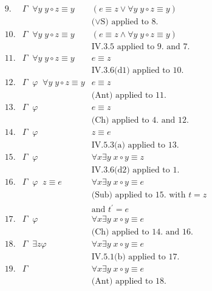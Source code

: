 \begin{enumerate}[1.]
\begin{enumerate}[(i)]
\begin{enumerate}
\[\begin{array}{lll}
9. & \Gamma \;\; \forall y \; y \circ z \equiv y & (e \equiv z \lor \forall y \; y \circ z \equiv y) \\
\  & \                   & \mbox{($\lor$S) applied to 8.} \\
10.& \Gamma \;\; \forall y \; y \circ z \equiv y & (e \equiv z \land \forall y \; y \circ z \equiv y) \\
\  & \                   & \mbox{IV.3.5 applied to 9. and 7.} \\
11.& \Gamma \;\; \forall y \; y \circ z \equiv y & e \equiv z \\
\  & \                   & \mbox{IV.3.6(d1) applied to 10.} \\
12.& \Gamma \;\; \varphi \;\; \forall y \; y \circ z \equiv y & e \equiv z \\
\  & \                   & \mbox{(Ant) applied to 11.} \\
13.& \Gamma \;\; \varphi & e \equiv z \\
\  & \                   & \mbox{(Ch) applied to 4. and 12.} \\
14.& \Gamma \;\; \varphi & z \equiv e \\
\  & \                   & \mbox{IV.5.3(a) applied to 13.} \\
15.& \Gamma \;\; \varphi & \forall x \exists y \; x \circ y \equiv z \\
\  & \                   & \mbox{IV.3.6(d2) applied to 1.} \\
16.& \Gamma \;\; \varphi \;\; z \equiv e & \forall x \exists y \; x \circ y \equiv e \\
\  & \                   & \mbox{(Sub) applied to 15. with $t = z$} \\
\  & \                   & \mbox{and $t^\prime = e$} \\
17.& \Gamma \;\; \varphi & \forall x \exists y \; x \circ y \equiv e \\
\  & \                   & \mbox{(Ch) applied to 14. and 16.} \\
18.& \Gamma \;\; \exists z \varphi & \forall x \exists y \; x \circ y \equiv e \\
\  & \                   & \mbox{IV.5.1(b) applied to 17.} \\
19.& \Gamma              & \forall x \exists y \; x \circ y \equiv e \\
\  & \                   & \mbox{(Ant) applied to 18.}
\end{array}
\]
\end{enumerate}
\end{enumerate}

\end{enumerate}
